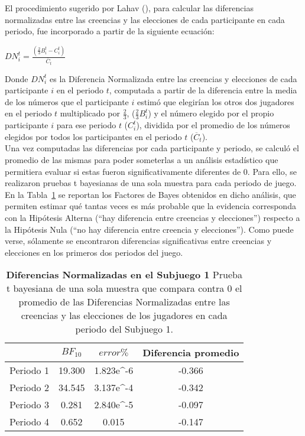 El procedimiento sugerido por Lahav (\citeyear{Lahav}), para calcular las diferencias normalizadas entre las creencias y las elecciones de cada participante en cada periodo, fue incorporado a partir de la siguiente ecuación:\\

\begin{center}
$DN_i^t =  \frac{(\frac{2}{3}B_i^t - C_i^t)}{\overline{C}_t} $
\end{center}

Donde $DN_i^t$ es la Diferencia Normalizada entre las creencias y elecciones de cada participante $i$ en el periodo $t$, computada a partir de la diferencia entre  la media de los números que el participante $i$ estimó que elegirían los otros dos jugadores en el periodo $t$ multiplicado por $\frac{2}{3}$, ($\frac{2}{3}B_i^t$) y el número elegido por el propio participante $i$ para ese periodo $t$ ($C_i^t$), dividida por el promedio de los números elegidos por todos los participantes en el periodo $t$ ($\overline{C}_t$).\\

Una vez computadas las diferencias por cada participante y periodo, se calculó el promedio de las mismas para poder someterlas a un análisis estadístico que permitiera evaluar si estas fueron significativamente diferentes de 0. Para ello, se realizaron pruebas t bayesianas de una sola muestra para cada periodo de juego. En la Tabla~\ref{DN-S1-B} se reportan los Factores de Bayes obtenidos en dicho análisis, que permiten estimar qué tantas veces es más probable que la evidencia corresponda con la Hipótesis Alterna (``hay diferencia entre creencias y elecciones'') respecto a la Hipótesis Nula (``no hay diferencia entre creencia y elecciones''). Como puede verse, sólamente se encontraron diferencias significativas entre creencias y elecciones en los primeros dos periodos del juego.\\

\begin{table}[h]
\caption[Diferencias Normalizadas en el Subjuego 1 (prueba t de una muestra)]{\textbf{Diferencias Normalizadas en el Subjuego 1} Prueba t bayesiana de una sola muestra que compara contra 0 el promedio de las Diferencias Normalizadas entre las creencias y las elecciones de los jugadores en cada periodo del Subjuego 1.}
\label{DN-S1-B}
\centering
\begin{tabular}{l | c c | c}
\toprule
\textbf{} & \textbf{$BF_{10}$} & \textbf{$error\%$} & \textbf{Diferencia promedio}\\
\midrule
Periodo 1 & 19.300 & 1.823e^-6 & -0.366\\
Periodo 2 & 34.545 & 3.137e^-4 & -0.342\\
Periodo 3 & 0.281 & 2.840e^-5 & -0.097\\
Periodo 4 & 0.652 & 0.015 & -0.147\\
\bottomrule
\end{tabular}
\end{table}


